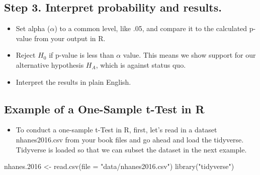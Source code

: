 \documentclass[
  letterpaper,
  DIV=11,
  numbers=noendperiod]{scrreprt}
\newenvironment{Shaded}{\begin{snugshade}}{\end{snugshade}}
\newcommand{\AttributeTok}[1]{\textcolor[rgb]{0.40,0.45,0.13}{#1}}
\newcommand{\FloatTok}[1]{\textcolor[rgb]{0.68,0.00,0.00}{#1}}
\newcommand{\FunctionTok}[1]{\textcolor[rgb]{0.28,0.35,0.67}{#1}}
\newcommand{\NormalTok}[1]{\textcolor[rgb]{0.00,0.23,0.31}{#1}}
\newcommand{\OtherTok}[1]{\textcolor[rgb]{0.00,0.23,0.31}{#1}}
\newcommand{\StringTok}[1]{\textcolor[rgb]{0.13,0.47,0.30}{#1}}
\providecommand{\tightlist}{%
  \setlength{\itemsep}{0pt}\setlength{\parskip}{0pt}}\usepackage{longtable,booktabs,array}
\begin{document}
\subsection{Step 3. Interpret probability and
results.}\label{step-3.-interpret-probability-and-results.}

\begin{itemize}
\tightlist
\item
  Set alpha (\(\alpha\)) to a common level, like .05, and compare it to
  the calculated p-value from your output in R.
\item
  Reject \(H_0\) if p-value is less than \(\alpha\) value. This means we
  show support for our alternative hypothesis \(H_A\), which is against
  status quo.
\item
  Interpret the results in plain English.
\end{itemize}

\subsection{Example of a One-Sample t-Test in
R}\label{example-of-a-one-sample-t-test-in-r}

\begin{itemize}
\tightlist
\item
  To conduct a one-sample t-Test in R, first, let's read in a dataset
  nhanes2016.csv from your book files and go ahead and load the
  tidyverse. Tidyverse is loaded so that we can subset the dataset in
  the next example.
\end{itemize}

\begin{Shaded}
\begin{Highlighting}[]
\NormalTok{nhanes}\FloatTok{.2016} \OtherTok{\textless{}{-}} \FunctionTok{read.csv}\NormalTok{(}\AttributeTok{file =} \StringTok{"data/nhanes2016.csv"}\NormalTok{)}
\FunctionTok{library}\NormalTok{(}\StringTok{"tidyverse"}\NormalTok{)}
\end{Highlighting}
\end{Shaded}
\end{document}
